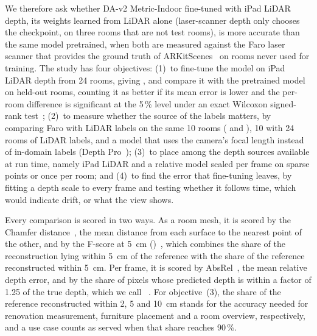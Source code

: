 We therefore ask whether DA-v2 Metric-Indoor fine-tuned with iPad LiDAR depth, its weights learned from LiDAR alone
(laser-scanner depth only chooses the checkpoint, on three rooms that are not test rooms), is more accurate than the same model pretrained, when both are measured against the Faro laser scanner that provides
the ground truth of ARKitScenes~\cite{arkitscenes} on rooms never used for training. The study has four objectives:
(1)~to fine-tune the model on iPad LiDAR depth from 24 rooms, giving \ftmain{}, and compare it with the pretrained
model on held-out rooms, counting it as better if its mean error is lower and the per-room difference is significant
at the 5\,\% level under an exact Wilcoxon signed-rank test~\cite{wilcoxon}; (2)~to measure whether the source of the
labels matters, by comparing Faro with LiDAR labels on the same 10 rooms (\ftfaro{} and \ftlidar{}), 10 with 24 rooms
of LiDAR labels, and a model that uses the camera's focal length instead of in-domain labels (Depth
Pro~\cite{depthpro}); (3)~to place \ftmain{} among the depth sources available at run time, namely iPad LiDAR and a
relative model scaled per frame on sparse points or once per room; and (4)~to find the error that fine-tuning leaves,
by fitting a depth scale to every frame and testing whether it follows time, which would indicate drift, or what the
view shows.

Every comparison is scored in two ways. As a room mesh, it is scored by the Chamfer distance~\cite{chamfer}, the mean
distance from each surface to the nearest point of the other, and by the F-score at \SI{5}{cm} (\fscore{})~\cite{tanks},
which combines the share of the reconstruction lying within \SI{5}{cm} of the reference with the share of the
reference reconstructed within \SI{5}{cm}. Per frame, it is scored by AbsRel~\cite{eigen14}, the mean relative depth
error, and by the share of pixels whose predicted depth is within a factor of 1.25 of the true depth, which we call
\wone{}~\cite{eigen14}. For objective~(3), the share of the reference reconstructed within 2, 5 and \SI{10}{cm} stands for the
accuracy needed for renovation measurement, furniture placement and a room overview, respectively, and a use case
counts as served when that share reaches 90\,\%.

